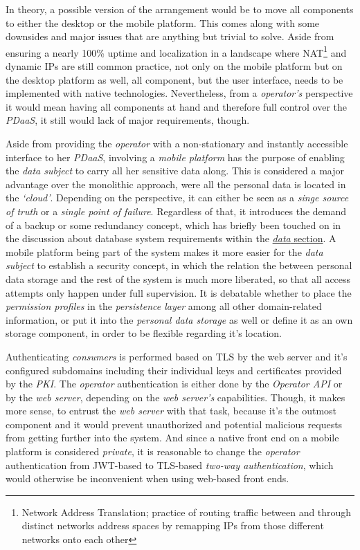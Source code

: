 \documentclass[12pt,english,a4paper,titlepage,cleardoublepage=empty,dottedtoc]{report}
\begin{document}
In theory, a possible version of the arrangement would be to move all
components to either the desktop or the mobile platform. This comes
along with some downsides and major issues that are anything but trivial
to solve. Aside from ensuring a nearly 100\% uptime and localization in
a landscape where NAT\footnote{Network Address Translation; practice of
  routing traffic between and through distinct networks address spaces
  by remapping IPs from those different networks onto each other} and
dynamic IPs are still common practice, not only on the mobile platform
but on the desktop platform as well, all component, but the user
interface, needs to be implemented with native technologies.
Nevertheless, from a \emph{operator's} perspective it would mean having
all components at hand and therefore full control over the \emph{PDaaS},
it still would lack of major requirements, though.

Aside from providing the \emph{operator} with a non-stationary and
instantly accessible interface to her \emph{PDaaS}, involving a
\emph{mobile platform} has the purpose of enabling the \emph{data
subject} to carry all her sensitive data along. This is considered a
major advantage over the monolithic approach, were all the personal data
is located in the \emph{`cloud'}. Depending on the perspective, it can
either be seen as a \emph{singe source of truth} or a \emph{single point
of failure}. Regardless of that, it introduces the demand of a backup or
some redundancy concept, which has briefly been touched on in the
discussion about database system requirements within the
\protect\hyperlink{data}{\emph{data} section}. A mobile platform being
part of the system makes it more easier for the \emph{data subject} to
establish a security concept, in which the relation the between personal
data storage and the rest of the system is much more liberated, so that
all access attempts only happen under full supervision. It is debatable
whether to place the \emph{permission profiles} in the \emph{persistence
layer} among all other domain-related information, or put it into the
\emph{personal data storage} as well or define it as an own storage
component, in order to be flexible regarding it's location.

Authenticating \emph{consumers} is performed based on TLS by the web
server and it's configured subdomains including their individual keys
and certificates provided by the \emph{PKI}. The \emph{operator}
authentication is either done by the \emph{Operator API} or by the
\emph{web server}, depending on the \emph{web server's} capabilities.
Though, it makes more sense, to entrust the \emph{web server} with that
task, because it's the outmost component and it would prevent
unauthorized and potential malicious requests from getting further into
the system. And since a native front end on a mobile platform is
considered \emph{private}, it is reasonable to change the
\emph{operator} authentication from JWT-based to TLS-based \emph{two-way
authentication}, which would otherwise be inconvenient when using
web-based front ends.
\end{document}
